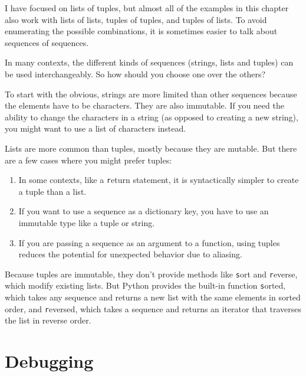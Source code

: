 \documentclass[
DIV=11,
fontsize=12,
twoside,
headinclude=false,
titlepage=firstiscover,
abstract=true,
headsepline=true,
footsepline=true,
chapterprefix=true, %
headings=big,
bibliography=totoc,%
captions=tableheading
]{scrbook}
\theoremstyle{definition}
\begin{document}
I have focused on lists of tuples, but almost all of the examples in
this chapter also work with lists of lists, tuples of tuples, and
tuples of lists.  To avoid enumerating the possible combinations, it
is sometimes easier to talk about sequences of sequences.

In many contexts, the different kinds of sequences (strings, lists and
tuples) can be used interchangeably.  So how should you choose one
over the others?

To start with the obvious, strings are more limited than other
sequences because the elements have to be characters.  They are
also immutable.  If you need the ability to change the characters
in a string (as opposed to creating a new string), you might
want to use a list of characters instead.

Lists are more common than tuples, mostly because they are mutable.
But there are a few cases where you might prefer tuples:

\begin{enumerate}

\item In some contexts, like a {\texttt return} statement, it is
syntactically simpler to create a tuple than a list.

\item If you want to use a sequence as a dictionary key, you
have to use an immutable type like a tuple or string.

\item If you are passing a sequence as an argument to a function,
using tuples reduces the potential for unexpected behavior
due to aliasing.

\end{enumerate}

Because tuples are immutable, they don't provide methods like {\texttt
  sort} and {\texttt reverse}, which modify existing lists.  But Python
provides the built-in function {\texttt sorted}, which takes any sequence
and returns a new list with the same elements in sorted order, and
{\texttt reversed}, which takes a sequence and returns an iterator that
traverses the list in reverse order.
 


\section{Debugging}
\end{document}
